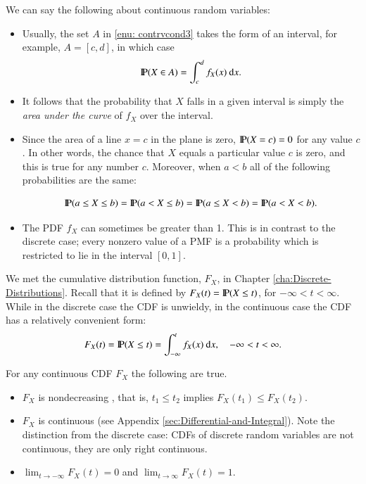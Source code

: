 \documentclass[captions=tableheading]{scrbook}
\begin{document}
\begin{rem}
We can say the following about continuous random variables:

\begin{itemize}
\item Usually, the set \(A\) in \ref{enu: contrvcond3} takes the form of an interval, for example, \(A=[c,d]\), in which case
  \begin{equation}
  \P(X\in A)=\int_{c}^{d}f_{X}(x)\:\mathrm{d} x.
  \end{equation}
\item It follows that the probability that \(X\) falls in a given interval is simply the \emph{area under the curve} of \(f_{X}\) over the interval.
\item Since the area of a line \(x=c\) in the plane is zero, \(\P(X=c)=0\)  for any value \(c\). In other words, the chance that \(X\) equals a particular value \(c\) is zero, and this is true for any number \(c\). Moreover, when \(a<b\) all of the following probabilities are the same:

  \begin{equation}
  \P(a\leq X\leq b)=\P(a<X\leq b)=\P(a\leq X<b)=\P(a<X<b).
  \end{equation}
\item The PDF \(f_{X}\) can sometimes be greater than 1. This is in contrast to the discrete case; every nonzero value of a PMF is a probability which is restricted to lie in the interval \([0,1]\).
\end{itemize}

\end{rem}

We met the cumulative distribution function, \(F_{X}\), in Chapter \ref{cha:Discrete-Distributions}. Recall that it is defined by \(F_{X}(t)=\P(X\leq t)\), for \(-\infty<t<\infty\). While in the discrete case the CDF is unwieldy, in the continuous case the CDF has a relatively convenient form:
\begin{equation}
F_{X}(t)=\P(X\leq t)=\int_{-\infty}^{t}f_{X}(x)\:\mathrm{d} x,\quad-\infty<t<\infty.
\end{equation}

\begin{rem}
For any continuous CDF \(F_{X}\) the following are true.

\begin{itemize}
\item \(F_{X}\) is nondecreasing , that is, \(t_{1}\leq t_{2}\) implies \(F_{X}(t_{1})\leq F_{X}(t_{2})\).
\item \(F_{X}\) is continuous (see Appendix \ref{sec:Differential-and-Integral}). Note the distinction from the discrete case: CDFs of discrete random variables are not continuous, they are only right continuous.
\item \(\lim_{t\to-\infty}F_{X}(t)=0\) and \(\lim_{t\to\infty}F_{X}(t)=1\).
\end{itemize}

\end{rem}
\end{document}
